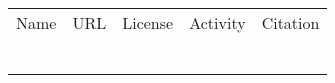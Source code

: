 \begin{table} 
    \begin{tabular}{ c c c c c }
     Name    & URL & License & Activity & Citation \\ 
         &  &  &  &  \\ 
         &  &  &  &  \\ 
         &  &  &  &  \\ 
         &  &  &  &  \\ 
         &  &  &  &  \\ 
         &  &  &  &  \\ 
    \end{tabular} 
\end{table}